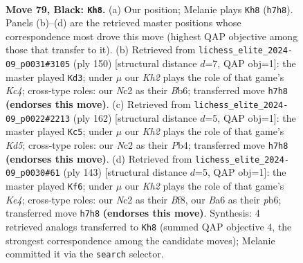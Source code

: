 \documentclass[11pt]{article}
\begin{document}
\clearpage

\begin{figure}[p]\centering
\begin{subfigure}{0.46\textwidth}\centering
\resizebox{\linewidth}{!}{%
\newchessgame
\chessboard[
  setfen={8/7k/b7/8/5B2/7K/2n2P2/8 b - - 4 79},
  showmover=false,
  pgfstyle=straightmove, color=movearrow, markmove={h7-h8}
]}
\caption{}
\end{subfigure}\hfill
\begin{subfigure}{0.46\textwidth}\centering
\resizebox{\linewidth}{!}{%
\newchessgame
\chessboard[
  setfen={8/8/1B6/4bk2/2K5/5p2/8/8 w - - 0 76},
  showmover=false,
  pgfstyle=straightmove, color=movearrow, markmove={c4-d3}
]}
\caption{}
\end{subfigure}
\\[4pt]
\begin{subfigure}{0.46\textwidth}\centering
\resizebox{\linewidth}{!}{%
\newchessgame
\chessboard[
  setfen={8/7b/8/1p1K4/1P6/6B1/8/k7 w - - 40 82},
  showmover=false,
  pgfstyle=straightmove, color=movearrow, markmove={d5-c5}
]}
\caption{}
\end{subfigure}\hfill
\begin{subfigure}{0.46\textwidth}\centering
\resizebox{\linewidth}{!}{%
\newchessgame
\chessboard[
  setfen={2B2b2/8/1P4P1/4k3/8/3K4/8/8 b - - 0 72},
  showmover=false,
  pgfstyle=straightmove, color=movearrow, markmove={e5-f6}
]}
\caption{}
\end{subfigure}
\caption{\textbf{Move 79, Black: \texttt{Kh8}.} (a) Our position; Melanie plays \texttt{Kh8} (\texttt{h7h8}). Panels (b)--(d) are the retrieved master positions whose correspondence most drove this move (highest QAP objective among those that transfer to it). (b) Retrieved from \texttt{lichess\_elite\_2024-09\_p0031\#3105} (ply 150) [structural distance $d$=7, QAP obj=1]: the master played \texttt{Kd3}; under $\mu$ our \emph{Kh2} plays the role of that game's \emph{Kc4}; cross-type roles: our \emph{N}c2 as their \emph{B}b6; transferred move \texttt{h7h8} \textbf{(endorses this move)}. (c) Retrieved from \texttt{lichess\_elite\_2024-09\_p0022\#2213} (ply 162) [structural distance $d$=5, QAP obj=1]: the master played \texttt{Kc5}; under $\mu$ our \emph{Kh2} plays the role of that game's \emph{Kd5}; cross-type roles: our \emph{N}c2 as their \emph{P}b4; transferred move \texttt{h7h8} \textbf{(endorses this move)}. (d) Retrieved from \texttt{lichess\_elite\_2024-09\_p0030\#61} (ply 143) [structural distance $d$=5, QAP obj=1]: the master played \texttt{Kf6}; under $\mu$ our \emph{Kh2} plays the role of that game's \emph{Ke4}; cross-type roles: our \emph{N}c2 as their \emph{B}f8, our \emph{B}a6 as their \emph{p}b6; transferred move \texttt{h7h8} \textbf{(endorses this move)}. Synthesis: 4 retrieved analogs transferred to \texttt{Kh8} (summed QAP objective 4, the strongest correspondence among the candidate moves); Melanie committed it via the \texttt{search} selector.}
\label{fig:thought-m157}
\end{figure}
\end{document}
